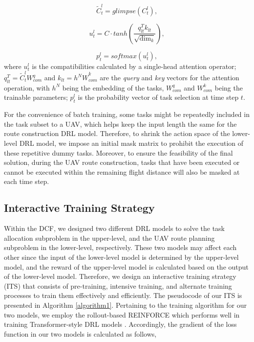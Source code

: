 \documentclass[lettersize,journal]{IEEEtran}
\begin{document}
	\begin{equation}
		{\widetilde{C}}_t^l=glimpse\left(C_t^l\right),
	\end{equation}
	
	\begin{equation}
		u_t^l=C\cdot tanh(\frac{q_{lt}^Tk_{lt}}{\sqrt{\dim_k}}),
	\end{equation}
	
	\begin{equation}
		p_t^l=softmax(u_t^l),
	\end{equation}
	where $u_t^l$ is the compatibilities calculated by a single-head attention operator;
	$q_{lt}^T={\widetilde{C}}_t^lW_{com}^q$ and $k_{lt}={h^NW}_{com}^k$ are the \textit{query} and \textit{key} vectors for the attention operation, with $h^N$ being the embedding of the tasks, $W_{com}^q$ and $W_{com}^k$ being the trainable parameters; $p_t^l$ is the probability vector of task selection at time step $t$. 
	
	For the convenience of batch training, some tasks might be repeatedly included in the task subset to a UAV, which helps keep the input length the same for the route construction DRL model. Therefore, to shrink the action space of the lower-level DRL model, we impose an initial mask matrix to prohibit the execution of these repetitive dummy tasks. Moreover, to ensure the feasibility of the final solution, during the UAV route construction, tasks that have been executed or cannot be executed within the remaining flight distance will also be masked at each time step.
	
	\subsection{Interactive Training Strategy}
	
	Within the DCF, we designed two different DRL models to solve the task allocation subproblem in the upper-level, and the UAV route planning subproblem in the lower-level, respectively. These two models may affect each other since the input of the lower-level model is determined by the upper-level model, and the reward of the upper-level model is calculated based on the output of the lower-level model. Therefore, we design an interactive training strategy (ITS) that consists of pre-training, intensive training, and alternate training processes to train them effectively and efficiently. The pseudocode of our ITS is presented in Algorithm \ref{algorithm1}. Pertaining to the training algorithm for our two models, we employ the rollout-based REINFORCE which performs well in training Transformer-style DRL models \cite{xuReinforcementLearningMultiple2022, huReinforcementLearningApproach2020, liDeepReinforcementLearning2021c}. Accordingly, the gradient of the loss function in our two models is calculated as follows,%
	
\end{document}
